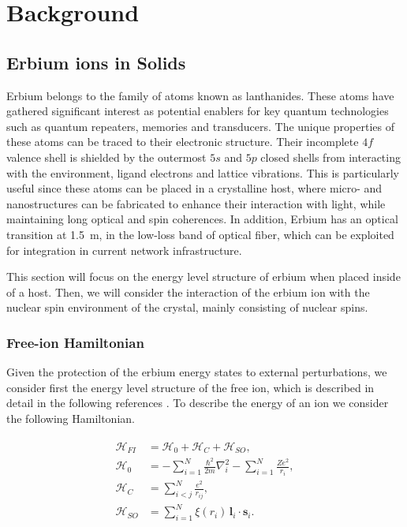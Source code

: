 \setchapterpreamble[u]{\margintoc}
\chapter{Background}

\section{Erbium ions in Solids}

Erbium belongs to the family of atoms known as lanthanides. These atoms have gathered significant interest as potential enablers for key quantum technologies such as quantum repeaters, memories and transducers. The unique properties of these atoms can be traced to their electronic structure. Their incomplete $4f$ valence shell is shielded by the outermost $5s$ and $5p$ closed shells from interacting with the environment, ligand electrons and lattice vibrations. This is particularly useful since these atoms can be placed in a crystalline host, where micro- and nanostructures can be fabricated to enhance their interaction with light, while maintaining long optical and spin coherences. In addition, Erbium has an optical transition at 1.5~\textmu m, in the low-loss band of optical fiber, which can be exploited for integration in current network infrastructure. 

This section will focus on the energy level structure of erbium when placed inside of a \Ca host. Then, we will consider the interaction of the erbium ion with the nuclear spin environment of the crystal, mainly consisting of \W nuclear spins. 

\subsection{Free-ion Hamiltonian}

Given the protection of the erbium energy states to external perturbations, we consider first the energy level structure of the free \Er ion, which is described in detail in the following references . To describe the energy of an ion we consider the following Hamiltonian.

\begin{align}
\begin{split}
\mathcal{H}_{FI} &= \mathcal{H}_0 + \mathcal{H}_C + \mathcal{H}_{SO}, \\
\mathcal{H}_0 &= - \sum_{i=1}^N \frac{\hbar^2}{2m} \nabla_i^2 
- \sum_{i=1}^N \frac{Ze^2}{r_i}, \\
\mathcal{H}_C &= \sum_{i<j}^N \frac{e^2}{r_{ij}}, \\
\mathcal{H}_{SO} &= \sum_{i=1}^N \xi(r_i)\,\mathbf{l}_i \cdot \mathbf{s}_i.
\end{split}
\end{align}

